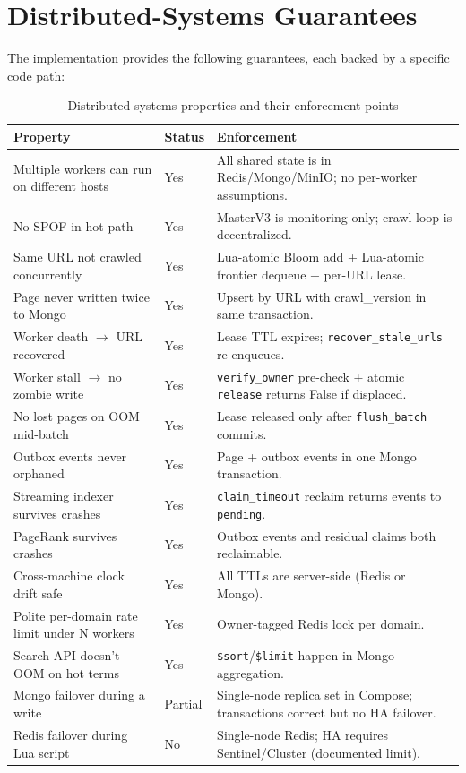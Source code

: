 \documentclass[11pt,a4paper]{article}
\newcommand{\code}[1]{\texttt{#1}}
\begin{document}
\section{Distributed-Systems Guarantees}

The implementation provides the following guarantees, each backed by a specific code path:

\begin{table}[H]
\centering
\caption{Distributed-systems properties and their enforcement points}
\small
\begin{tabular}{p{}p{}p{}}
\toprule
Property & Status & Enforcement \\
\midrule
Multiple workers can run on different hosts & Yes & All shared state is in Redis/Mongo/MinIO; no per-worker assumptions.\\
No SPOF in hot path & Yes & MasterV3 is monitoring-only; crawl loop is decentralized.\\
Same URL not crawled concurrently & Yes & Lua-atomic Bloom add + Lua-atomic frontier dequeue + per-URL lease.\\
Page never written twice to Mongo & Yes & Upsert by URL with crawl\_version in same transaction.\\
Worker death $\to$ URL recovered & Yes & Lease TTL expires; \code{recover\_stale\_urls} re-enqueues.\\
Worker stall $\to$ no zombie write & Yes & \code{verify\_owner} pre-check + atomic \code{release} returns False if displaced.\\
No lost pages on OOM mid-batch & Yes & Lease released only after \code{flush\_batch} commits.\\
Outbox events never orphaned & Yes & Page + outbox events in one Mongo transaction.\\
Streaming indexer survives crashes & Yes & \code{claim\_timeout} reclaim returns events to \code{pending}.\\
PageRank survives crashes & Yes & Outbox events and residual claims both reclaimable.\\
Cross-machine clock drift safe & Yes & All TTLs are server-side (Redis or Mongo).\\
Polite per-domain rate limit under N workers & Yes & Owner-tagged Redis lock per domain.\\
Search API doesn't OOM on hot terms & Yes & \code{\$sort}/\code{\$limit} happen in Mongo aggregation.\\
Mongo failover during a write & Partial & Single-node replica set in Compose; transactions correct but no HA failover.\\
Redis failover during Lua script & No & Single-node Redis; HA requires Sentinel/Cluster (documented limit).\\
\bottomrule
\end{tabular}
\normalsize
\end{table}
\end{document}
